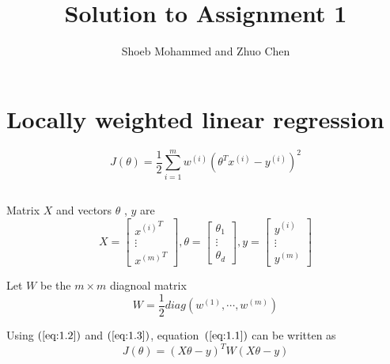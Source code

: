 \documentclass{article}
\begin{document}
\title{Solution to Assignment 1}
\author{Shoeb Mohammed and Zhuo Chen}
\maketitle

\section{Locally weighted linear regression}

\begin{equation}
  \label{eq:1.1}
  J(\theta) = \frac{1}{2}\sum_{i=1}^m w^{(i)}(\theta^Tx^{(i)}-y^{(i)})^2
\end{equation}

\subsection{}

Matrix $X$ and vectors $\theta$ , $y$ are
\begin{equation}
  \label{eq:1.2}
  X =
  \begin{bmatrix}
    {x^{(i)}}^T \\
    \vdots \\
    {x^{(m)}}^T
  \end{bmatrix}
  ,
  \theta =
  \begin{bmatrix}
    \theta_1 \\
    \vdots \\
    \theta_d
  \end{bmatrix}
  ,
  y =
  \begin{bmatrix}
    y^{(i)} \\
    \vdots \\
    y^{(m)}
  \end{bmatrix}
\end{equation}

Let $W$ be the $m \times m$ diagnoal matrix
\begin{equation}
  \label{eq:1.3}
  W = \frac{1}{2}diag(w^{(1)},\cdots,w^{(m)})
\end{equation}

Using $(\ref{eq:1.2})$ and $(\ref{eq:1.3})$, equation~$(\ref{eq:1.1})$ can be written as
\begin{equation}
  \label{eq:1.4}
  J(\theta) = (X\theta - y)^T W (X\theta - y)
\end{equation}
\end{document}
